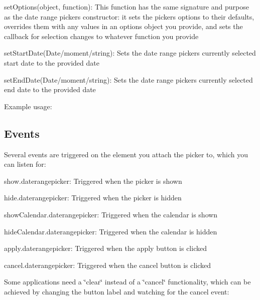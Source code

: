 {\ttfamily set\+Options(object, function)}\+: This function has the same signature and purpose as the date range picker\textquotesingle{}s constructor\+: it sets the picker\textquotesingle{}s options to their defaults, overrides them with any values in an options object you provide, and sets the callback for selection changes to whatever function you provide

{\ttfamily set\+Start\+Date(Date/moment/string)}\+: Sets the date range picker\textquotesingle{}s currently selected start date to the provided date

{\ttfamily set\+End\+Date(Date/moment/string)}\+: Sets the date range picker\textquotesingle{}s currently selected end date to the provided date

Example usage\+:




\subsection*{Events}

Several events are triggered on the element you attach the picker to, which you can listen for\+:

{\ttfamily show.\+daterangepicker}\+: Triggered when the picker is shown

{\ttfamily hide.\+daterangepicker}\+: Triggered when the picker is hidden

{\ttfamily show\+Calendar.\+daterangepicker}\+: Triggered when the calendar is shown

{\ttfamily hide\+Calendar.\+daterangepicker}\+: Triggered when the calendar is hidden

{\ttfamily apply.\+daterangepicker}\+: Triggered when the apply button is clicked

{\ttfamily cancel.\+daterangepicker}\+: Triggered when the cancel button is clicked

Some applications need a \char`\"{}clear\char`\"{} instead of a \char`\"{}cancel\char`\"{} functionality, which can be achieved by changing the button label and watching for the cancel event\+:


